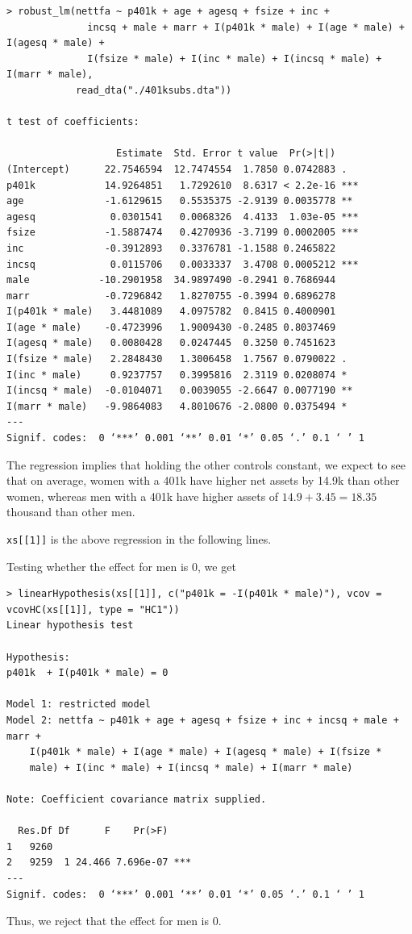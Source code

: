 \documentclass[12pt,letterpaper]{article}
\theoremstyle{definition}
\begin{document}
\begin{Verbatim}[fontsize=\small]
> robust_lm(nettfa ~ p401k + age + agesq + fsize + inc +
              incsq + male + marr + I(p401k * male) + I(age * male) + I(agesq * male) +
              I(fsize * male) + I(inc * male) + I(incsq * male) + I(marr * male),
            read_dta("./401ksubs.dta"))

t test of coefficients:

                   Estimate  Std. Error t value  Pr(>|t|)
(Intercept)      22.7546594  12.7474554  1.7850 0.0742883 .
p401k            14.9264851   1.7292610  8.6317 < 2.2e-16 ***
age              -1.6129615   0.5535375 -2.9139 0.0035778 **
agesq             0.0301541   0.0068326  4.4133  1.03e-05 ***
fsize            -1.5887474   0.4270936 -3.7199 0.0002005 ***
inc              -0.3912893   0.3376781 -1.1588 0.2465822
incsq             0.0115706   0.0033337  3.4708 0.0005212 ***
male            -10.2901958  34.9897490 -0.2941 0.7686944
marr             -0.7296842   1.8270755 -0.3994 0.6896278
I(p401k * male)   3.4481089   4.0975782  0.8415 0.4000901
I(age * male)    -0.4723996   1.9009430 -0.2485 0.8037469
I(agesq * male)   0.0080428   0.0247445  0.3250 0.7451623
I(fsize * male)   2.2848430   1.3006458  1.7567 0.0790022 .
I(inc * male)     0.9237757   0.3995816  2.3119 0.0208074 *
I(incsq * male)  -0.0104071   0.0039055 -2.6647 0.0077190 **
I(marr * male)   -9.9864083   4.8010676 -2.0800 0.0375494 *
---
Signif. codes:  0 ‘***’ 0.001 ‘**’ 0.01 ‘*’ 0.05 ‘.’ 0.1 ‘ ’ 1
\end{Verbatim}

The regression implies that holding the other controls constant, we expect to see that on average, women with a 401k have higher net assets by 14.9k than other women, whereas men with a 401k have higher assets of $14.9 + 3.45 = 18.35$ thousand than other men.

\verb|xs[[1]]| is the above regression in the following lines.

Testing whether the effect for men is $0$, we get
\begin{Verbatim}[fontsize=\small]
> linearHypothesis(xs[[1]], c("p401k = -I(p401k * male)"), vcov = vcovHC(xs[[1]], type = "HC1"))
Linear hypothesis test

Hypothesis:
p401k  + I(p401k * male) = 0

Model 1: restricted model
Model 2: nettfa ~ p401k + age + agesq + fsize + inc + incsq + male + marr +
    I(p401k * male) + I(age * male) + I(agesq * male) + I(fsize *
    male) + I(inc * male) + I(incsq * male) + I(marr * male)

Note: Coefficient covariance matrix supplied.

  Res.Df Df      F    Pr(>F)
1   9260
2   9259  1 24.466 7.696e-07 ***
---
Signif. codes:  0 ‘***’ 0.001 ‘**’ 0.01 ‘*’ 0.05 ‘.’ 0.1 ‘ ’ 1
\end{Verbatim}
Thus, we reject that the effect for men is 0.
\end{document}
